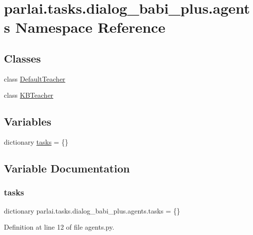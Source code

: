 \hypertarget{namespaceparlai_1_1tasks_1_1dialog__babi__plus_1_1agents}{}\section{parlai.\+tasks.\+dialog\+\_\+babi\+\_\+plus.\+agents Namespace Reference}
\label{namespaceparlai_1_1tasks_1_1dialog__babi__plus_1_1agents}
\subsection*{Classes}
\begin{DoxyCompactItemize}
\item 
class \hyperlink{classparlai_1_1tasks_1_1dialog__babi__plus_1_1agents_1_1DefaultTeacher}{Default\+Teacher}
\item 
class \hyperlink{classparlai_1_1tasks_1_1dialog__babi__plus_1_1agents_1_1KBTeacher}{K\+B\+Teacher}
\end{DoxyCompactItemize}
\subsection*{Variables}
\begin{DoxyCompactItemize}
\item 
dictionary \hyperlink{namespaceparlai_1_1tasks_1_1dialog__babi__plus_1_1agents_ac5c942c6388285b795a5006935acdb73}{tasks} = \{\}
\end{DoxyCompactItemize}


\subsection{Variable Documentation}
\mbox{\label{namespaceparlai_1_1tasks_1_1dialog__babi__plus_1_1agents_ac5c942c6388285b795a5006935acdb73}} 
\subsubsection{\texorpdfstring{tasks}{tasks}}
{\footnotesize\ttfamily dictionary parlai.\+tasks.\+dialog\+\_\+babi\+\_\+plus.\+agents.\+tasks = \{\}}



Definition at line 12 of file agents.\+py.

